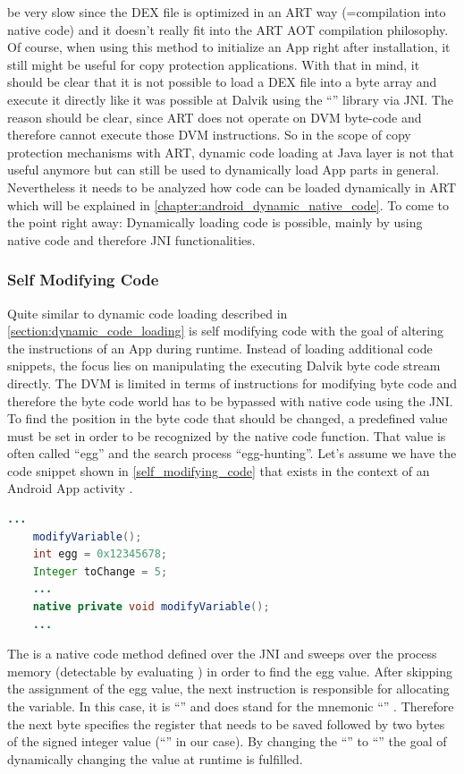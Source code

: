 be very slow since the DEX file is optimized in an ART way (=compilation
into native code) and it doesn't really fit into the ART AOT compilation
philosophy. Of course, when using this method to initialize an App right after installation, it still might be useful for copy protection applications.
With that in mind, it should be clear that it is not possible
to load a DEX file into a byte array and execute it directly like it was
possible at Dalvik using the ``'' library via JNI.
The reason should be clear, since ART does not operate on DVM byte-code and therefore cannot execute those DVM instructions.
So in the scope of copy protection mechanisms
with ART, dynamic code loading at Java layer is not that useful anymore
but can still be used to dynamically load App parts in general.
Nevertheless it needs to be analyzed how code can be loaded dynamically in ART which will be explained in \autoref{chapter:android_dynamic_native_code}.
To come to the point right away: Dynamically loading code is possible, mainly
by using native code and therefore JNI functionalities.

\subsubsection{Self Modifying Code}
Quite similar to dynamic code loading described in
\autoref{section:dynamic_code_loading} is self modifying code with the goal
of altering the instructions of an App during runtime.
Instead of loading additional code snippets, the focus lies on
manipulating the executing Dalvik byte code stream directly.
The DVM is limited in terms of instructions for modifying byte code
and therefore the byte code world has to be bypassed with native code using the JNI. To find the position in the byte code that should be changed, a predefined
value must be set in order to be recognized by the native code function.
That value is often called ``egg'' and the search process ``egg-hunting''.
Let's assume we have the code snippet shown in \autoref{self_modifying_code} that exists in the context of an Android App activity
\parencite{code_protection}.
 \begin{lstlisting}[language=Java, caption=Self Modifying Code Example, label=self_modifying_code]
    ...
    modifyVariable();
    int egg = 0x12345678;
    Integer toChange = 5;
    ...
    native private void modifyVariable();
    ...
\end{lstlisting}

The  is a native code method defined over the JNI
and sweeps over the process memory (detectable by evaluating
)
in order to find the egg value. After skipping the assignment of
the egg value, the next instruction is responsible for allocating
the  variable. In this case, it is ``''
and does stand for the mnemonic ``''
\parencite{bytecode_format}. Therefore the next byte specifies the
register that needs to be saved followed by two bytes of the signed integer value (``'' in our case). By changing the ``'' to
``'' the goal of dynamically changing the value at runtime
is fulfilled.

